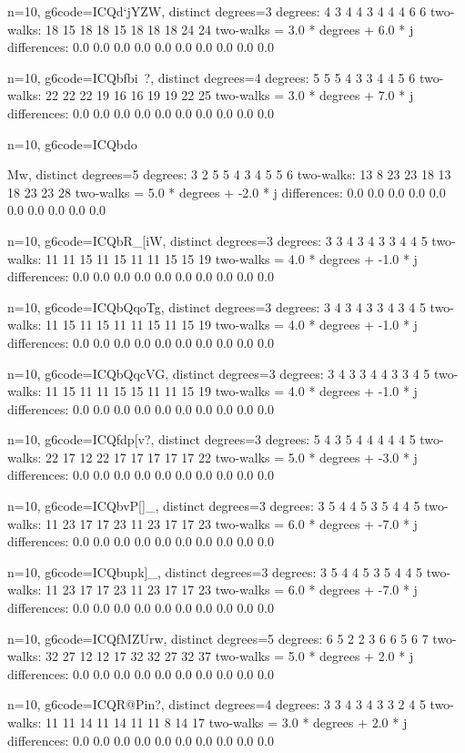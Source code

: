 {{{{{{{{{{{{{{{{n=10, g6code=ICQd`jYZW, distinct degrees=3
degrees: 4 3 4 4 3 4 4 4 6 6 
two-walks: 18 15 18 18 15 18 18 18 24 24 
two-walks = 3.0 * degrees + 6.0 * j
differences: 0.0 0.0 0.0 0.0 0.0 0.0 0.0 0.0 0.0 0.0 

n=10, g6code=ICQbfbi~?, distinct degrees=4
degrees: 5 5 5 4 3 3 4 4 5 6 
two-walks: 22 22 22 19 16 16 19 19 22 25 
two-walks = 3.0 * degrees + 7.0 * j
differences: 0.0 0.0 0.0 0.0 0.0 0.0 0.0 0.0 0.0 0.0 

n=10, g6code=ICQbdo{Mw, distinct degrees=5
degrees: 3 2 5 5 4 3 4 5 5 6 
two-walks: 13 8 23 23 18 13 18 23 23 28 
two-walks = 5.0 * degrees + -2.0 * j
differences: 0.0 0.0 0.0 0.0 0.0 0.0 0.0 0.0 0.0 0.0 

n=10, g6code=ICQbR_[iW, distinct degrees=3
degrees: 3 3 4 3 4 3 3 4 4 5 
two-walks: 11 11 15 11 15 11 11 15 15 19 
two-walks = 4.0 * degrees + -1.0 * j
differences: 0.0 0.0 0.0 0.0 0.0 0.0 0.0 0.0 0.0 0.0 

n=10, g6code=ICQbQqoTg, distinct degrees=3
degrees: 3 4 3 4 3 3 4 3 4 5 
two-walks: 11 15 11 15 11 11 15 11 15 19 
two-walks = 4.0 * degrees + -1.0 * j
differences: 0.0 0.0 0.0 0.0 0.0 0.0 0.0 0.0 0.0 0.0 

n=10, g6code=ICQbQqcVG, distinct degrees=3
degrees: 3 4 3 3 4 4 3 3 4 5 
two-walks: 11 15 11 11 15 15 11 11 15 19 
two-walks = 4.0 * degrees + -1.0 * j
differences: 0.0 0.0 0.0 0.0 0.0 0.0 0.0 0.0 0.0 0.0 

n=10, g6code=ICQfdp[v?, distinct degrees=3
degrees: 5 4 3 5 4 4 4 4 4 5 
two-walks: 22 17 12 22 17 17 17 17 17 22 
two-walks = 5.0 * degrees + -3.0 * j
differences: 0.0 0.0 0.0 0.0 0.0 0.0 0.0 0.0 0.0 0.0 

n=10, g6code=ICQbvP[]_, distinct degrees=3
degrees: 3 5 4 4 5 3 5 4 4 5 
two-walks: 11 23 17 17 23 11 23 17 17 23 
two-walks = 6.0 * degrees + -7.0 * j
differences: 0.0 0.0 0.0 0.0 0.0 0.0 0.0 0.0 0.0 0.0 

n=10, g6code=ICQbupk]_, distinct degrees=3
degrees: 3 5 4 4 5 3 5 4 4 5 
two-walks: 11 23 17 17 23 11 23 17 17 23 
two-walks = 6.0 * degrees + -7.0 * j
differences: 0.0 0.0 0.0 0.0 0.0 0.0 0.0 0.0 0.0 0.0 

n=10, g6code=ICQfMZUrw, distinct degrees=5
degrees: 6 5 2 2 3 6 6 5 6 7 
two-walks: 32 27 12 12 17 32 32 27 32 37 
two-walks = 5.0 * degrees + 2.0 * j
differences: 0.0 0.0 0.0 0.0 0.0 0.0 0.0 0.0 0.0 0.0 

n=10, g6code=ICQR@Pin?, distinct degrees=4
degrees: 3 3 4 3 4 3 3 2 4 5 
two-walks: 11 11 14 11 14 11 11 8 14 17 
two-walks = 3.0 * degrees + 2.0 * j
differences: 0.0 0.0 0.0 0.0 0.0 0.0 0.0 0.0 0.0 0.0 

}}}}}}}}}}}}}}}}}
